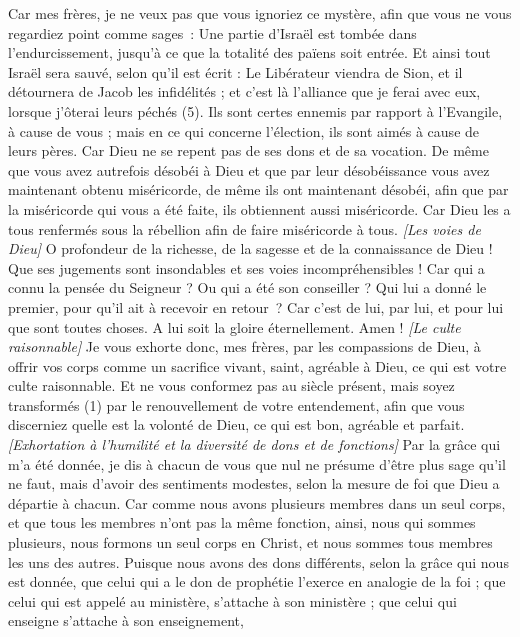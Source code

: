 \begin{multicols}{2}
Car mes frères, je ne veux pas que vous ignoriez ce mystère, afin que vous ne vous regardiez point comme sages : Une partie d’Israël est tombée dans l’endurcissement, jusqu’à ce que la totalité des païens soit entrée.
Et ainsi tout Israël sera sauvé, selon qu’il est écrit : Le Libérateur viendra de Sion, et il détournera de Jacob les infidélités ;
et c'est là l'alliance que je ferai avec eux, lorsque j'ôterai leurs péchés (5).
Ils sont certes ennemis par rapport à l'Evangile, à cause de vous ; mais en ce qui concerne l’élection, ils sont aimés à cause de leurs pères.
Car Dieu ne se repent pas de ses dons et de sa vocation.
De même que vous avez autrefois désobéi à Dieu et que par leur désobéissance vous avez maintenant obtenu miséricorde,
de même ils ont maintenant désobéi, afin que par la miséricorde qui vous a été faite, ils obtiennent aussi miséricorde.
Car Dieu les a tous renfermés sous la rébellion afin de faire miséricorde à tous.
\textit{[Les voies de Dieu]}
O profondeur de la richesse, de la sagesse et de la connaissance de Dieu ! Que ses jugements sont insondables et ses voies incompréhensibles !
Car qui a connu la pensée du Seigneur ? Ou qui a été son conseiller ?
Qui lui a donné le premier, pour qu’il ait à recevoir en retour ?
Car c’est de lui, par lui, et pour lui que sont toutes choses. A lui soit la gloire éternellement. Amen !
\textit{[Le culte raisonnable]}
\VerseOne{}Je vous exhorte donc, mes frères, par les compassions de Dieu, à offrir vos corps comme un sacrifice vivant, saint, agréable à Dieu, ce qui est votre culte raisonnable.
Et ne vous conformez pas au siècle présent, mais soyez transformés (1) par le renouvellement de votre entendement, afin que vous discerniez quelle est la volonté de Dieu, ce qui est bon, agréable et parfait.
\textit{[Exhortation à l'humilité et la diversité de dons et de fonctions]}
Par la grâce qui m’a été donnée, je dis à chacun de vous que nul ne présume d'être plus sage qu'il ne faut, mais d’avoir des sentiments modestes, selon la mesure de foi que Dieu a départie à chacun.
Car comme nous avons plusieurs membres dans un seul corps, et que tous les membres n'ont pas la même fonction,
ainsi, nous qui sommes plusieurs, nous formons un seul corps en Christ, et nous sommes tous membres les uns des autres.
Puisque nous avons des dons différents, selon la grâce qui nous est donnée, que celui qui a le don de prophétie l’exerce en analogie de la foi ;
que celui qui est appelé au ministère, s’attache à son ministère ; que celui qui enseigne s’attache à son enseignement,

\end{multicols}

